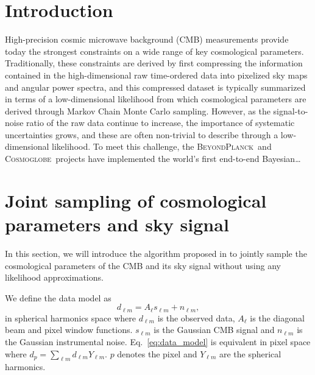 \documentclass[twocolumn]{../common/aa}
\newcommand{\BP}{\textsc{BeyondPlanck}}
\newcommand{\cosmoglobe}{\textsc{Cosmoglobe}}
\begin{document}

\maketitle

\tableofcontents




\section{Introduction}
\label{sec:introduction}

  High-precision cosmic microwave background (CMB) measurements provide today the strongest constraints on a wide range of key cosmological parameters. Traditionally, these constraints are derived by first compressing the information contained in the high-dimensional raw time-ordered data into pixelized sky maps and angular power spectra, and this compressed dataset is typically summarized in terms of a low-dimensional likelihood from which cosmological parameters are derived through Markov Chain Monte Carlo sampling. However, as the signal-to-noise ratio of the raw data continue to increase, the importance of systematic uncertainties grows, and these are often non-trivial to describe through a low-dimensional likelihood. To meet this challenge, the \BP\ and \cosmoglobe\ projects have implemented the world's first end-to-end Bayesian\ldots


\section{Joint sampling of cosmological parameters and sky signal}
\label{sec:methods}

In this section, we will introduce the algorithm proposed in \citet{racine:2016} to jointly sample the cosmological parameters of the CMB and its sky signal without using any likelihood approximations.

We define the data model as
\begin{equation}
    \label{eq:data_model}
    d_{\ell m} = A_{\ell} s_{\ell m} + n_{\ell m},
\end{equation}
in spherical harmonics space where $d_{\ell m}$ is the observed data, $A_\ell$ is the diagonal beam and pixel window functions. $s_{\ell m}$ is the Gaussian CMB signal and $n_{\ell m}$ is the Gaussian instrumental noise. Eq.~\eqref{eq:data_model} is equivalent in pixel space where $d_p = \sum_{\ell m} d_{\ell m} Y_{\ell m}$. $p$ denotes the pixel and $Y_{\ell m}$ are the spherical harmonics.
\end{document}
